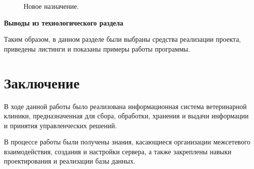 \documentclass[a4paper,14pt]{article}
\begin{document}
\newpage
\begin{figure}[!h]
	\caption{Новое назначение.}
	\label{fig:prescr}
\end{figure}

\textbf{Выводы из технологического раздела}

Таким образом, в данном разделе были выбраны средства реализации проекта, приведены листинги и показаны примеры работы программы.

\newpage
\section*{Заключение}

В ходе данной работы было реализована информационная система ветеринарной клиники, предназначенная для сбора, обработки, хранения и выдачи информации и принятия управленческих решений.

В процессе работы были получены знания, касающиеся организации межсетевого взаимодействия, создания и настройки сервера,  а также закреплены навыки проектирования и реализации базы данных.
\end{document}
